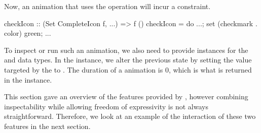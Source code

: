 Now, an animation that uses the  operation will incur a  constraint.

\begin{code}
checkIcon :: (Set CompleteIcon f, ...) => f ()
checkIcon = do ...; set (checkmark . color) green; ...
\end{code}

To inspect or run such an animation, we also need to provide instances for the  and  data types. In the  instance, we alter the previous state by setting the value targeted by the  to . The duration of a  animation is 0, which is what is returned in the  instance.


This section gave an overview of the features provided by \dsl{}, however combining inspectability while allowing freedom of expressivity is not always straightforward. Therefore, we look at an example of the interaction of these two features in the next section.
